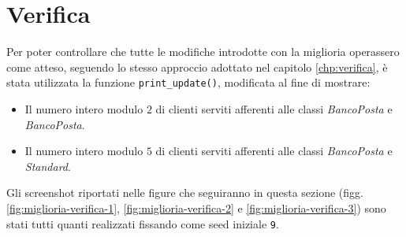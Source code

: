 \section{Verifica}\label{sec:miglioria-verifica}
Per poter controllare che tutte le modifiche introdotte con la miglioria operassero come atteso, seguendo lo stesso approccio adottato nel capitolo \ref{chp:verifica}, è stata utilizzata la funzione \texttt{print\_update()}, modificata al fine di mostrare:
\begin{itemize}
\item Il numero intero modulo $2$ di clienti serviti afferenti alle classi \uo{}	\textsl{BancoPosta} e \pp{} \textsl{BancoPosta}.
\item Il numero intero modulo $5$ di clienti serviti afferenti alle classi \sr{} \textsl{BancoPosta} e \sr{} \textsl{Standard}.
\end{itemize}

Gli screenshot riportati nelle figure che seguiranno in questa sezione (figg. \ref{fig:miglioria-verifica-1}, \ref{fig:miglioria-verifica-2} e \ref{fig:miglioria-verifica-3}) sono stati tutti quanti realizzati fissando come seed iniziale \texttt{9}.

